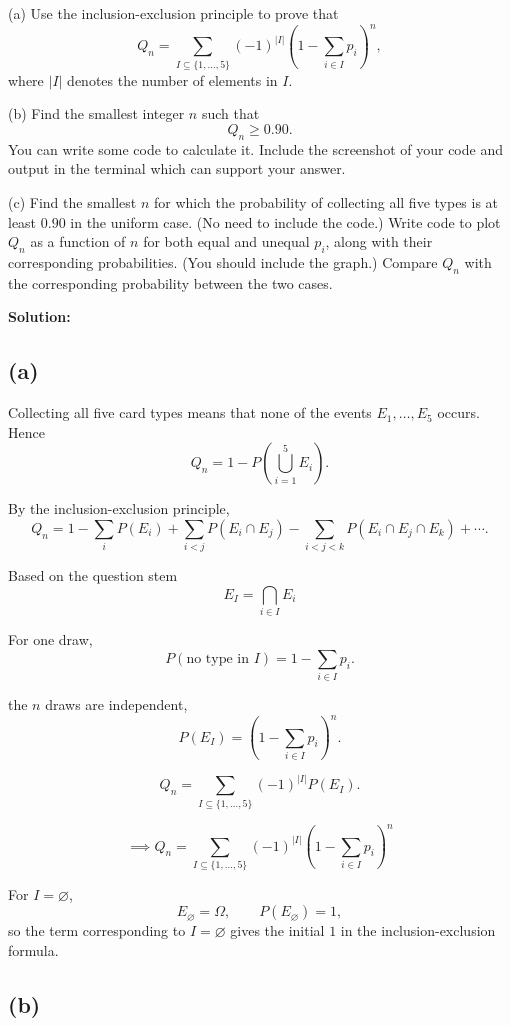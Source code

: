 \documentclass{article}
\begin{document}
\medskip

\noindent
(a) Use the inclusion-exclusion principle to prove that
\[
Q_n
=
\sum_{I\subseteq\{1,\ldots,5\}}
(-1)^{|I|}
\left(
1-\sum_{i\in I}p_i
\right)^n,
\]
where $|I|$ denotes the number of elements in $I$.

\medskip

\noindent
(b) Find the smallest integer $n$ such that
\[
Q_n\ge 0.90.
\]
You can write some code to calculate it. Include the screenshot of your code and output
in the terminal which can support your answer.

\medskip

\noindent
(c) Find the smallest $n$ for which the probability of collecting all five types is at
least $0.90$ in the uniform case. (No need to include the code.) Write code to plot
$Q_n$ as a function of $n$ for both equal and unequal $p_i$, along with their
corresponding probabilities. (You should include the graph.) Compare $Q_n$ with the
corresponding probability between the two cases.

\bigskip

\noindent\textbf{Solution:}

\subsection*{(a)}

Collecting all five card types means that none of the events
$E_1,\ldots,E_5$ occurs. Hence
\[
Q_n
=
1-
P\left(\bigcup_{i=1}^{5}E_i\right).
\]

By the inclusion-exclusion principle,
\[
Q_n
=
1
-\sum_{i}P(E_i)
+\sum_{i<j}P(E_i\cap E_j)
-\sum_{i<j<k}P(E_i\cap E_j\cap E_k)
+\cdots.
\]

Based on the question stem
\[
E_I=\bigcap_{i\in I}E_i
\]

For one draw,
\[
P(\text{no type in }I)
=
1-\sum_{i\in I}p_i.
\]

the $n$ draws are independent,
\[
P(E_I)
=
\left(
1-\sum_{i\in I}p_i
\right)^n.
\]


\[
Q_n
=
\sum_{I\subseteq\{1,\ldots,5\}}
(-1)^{|I|}
P(E_I).
\]

\[
\implies
Q_n
=
\sum_{I\subseteq\{1,\ldots,5\}}
(-1)^{|I|}
\left(
1-\sum_{i\in I}p_i
\right)^n
\]

For $I=\varnothing$,
\[
E_{\varnothing}=\Omega,
\qquad
P(E_{\varnothing})=1,
\]
so the term corresponding to $I=\varnothing$ gives the initial $1$ in the
inclusion-exclusion formula.

\subsection*{(b)}
\end{document}
